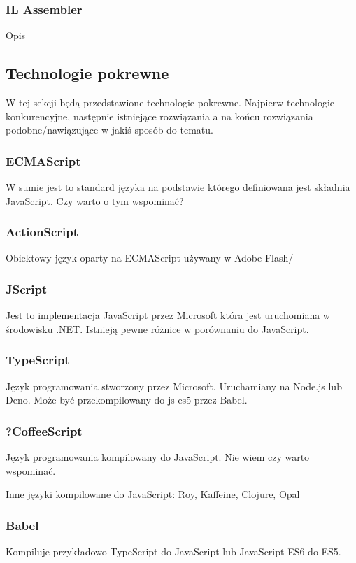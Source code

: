 \documentclass[a4paper]{article}
\begin{document}
\subsubsection{IL Assembler}
Opis

\subsection{Technologie pokrewne}
W tej sekcji będą przedstawione technologie pokrewne.
Najpierw technologie konkurencyjne, następnie istniejące rozwiązania a na końcu rozwiązania podobne/nawiązujące w jakiś sposób do tematu.

\subsubsection{ECMAScript}
W sumie jest to standard języka na podstawie którego definiowana jest składnia JavaScript. Czy warto o tym wspominać?

\subsubsection{ActionScript}
Obiektowy język oparty na ECMAScript używany w Adobe Flash/

\subsubsection{JScript}
Jest to implementacja JavaScript przez Microsoft która jest uruchomiana w środowisku .NET.
Istnieją pewne różnice w porównaniu do JavaScript.

\subsubsection{TypeScript}
Język programowania stworzony przez Microsoft. Uruchamiany na Node.js lub Deno. Może być przekompilowany do js es5 przez Babel.

\subsubsection{?CoffeeScript}
Język programowania kompilowany do JavaScript.
Nie wiem czy warto wspominać.

Inne języki kompilowane do JavaScript: Roy, Kaffeine, Clojure, Opal

\subsubsection{Babel}
Kompiluje przykładowo TypeScript do JavaScript lub JavaScript ES6 do ES5.
\end{document}
